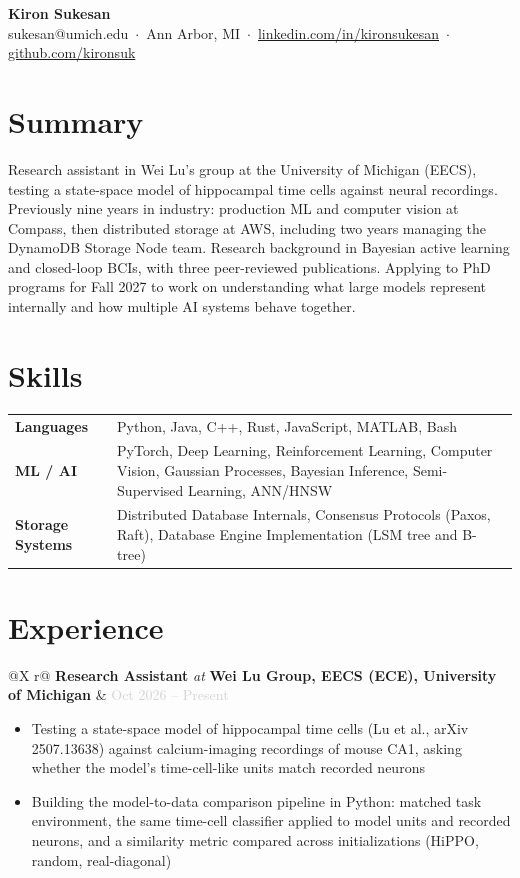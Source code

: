 \documentclass[10pt, letterpaper]{article}
\makeatletter
\newcommand{\resumeheader}[5]{%
  \begin{center}
    {\LARGE\bfseries #1}\\[4pt]
    {\color{lightgray}\small
      #2 \,$\cdot$\, #3 \,$\cdot$\, \href{#4}{linkedin.com/in/kironsukesan} \,$\cdot$\, \href{#5}{github.com/kironsuk}
    }
  \end{center}
}
\newcommand{\experienceentry}[4]{%
  \vspace{4pt}
  \noindent
  \begin{tabularx}{\linewidth}{@{}X r@{}}
    \textbf{#1} \textit{\color{lightgray}at} \textbf{#2} & \textcolor{lightgray}{\small #3} \\
    \multicolumn{2}{@{}l@{}}{\textit{\color{lightgray}\small #4}}
  \end{tabularx}
  \vspace{1pt}
}
\makeatother
\begin{document}
\pagestyle{empty}

\resumeheader
  {Kiron Sukesan}
  {sukesan@umich.edu}
  {Ann Arbor, MI}
  {https://linkedin.com/in/kironsukesan}
  {https://github.com/kironsuk}

\vspace{5pt}

\section{Summary}
Research assistant in Wei Lu's group at the University of Michigan (EECS), testing a state-space model of hippocampal time cells against neural recordings. Previously nine years in industry: production ML and computer vision at Compass, then distributed storage at AWS, including two years managing the DynamoDB Storage Node team. Research background in Bayesian active learning and closed-loop BCIs, with three peer-reviewed publications. Applying to PhD programs for Fall 2027 to work on understanding what large models represent internally and how multiple AI systems behave together.

\section{Skills}
\begin{tabularx}{\linewidth}{@{} l X @{}}
  \textbf{Languages}      & Python, Java, C++, Rust, JavaScript, MATLAB, Bash \\[2pt]
  \textbf{ML / AI}        & PyTorch, Deep Learning, Reinforcement Learning, Computer Vision, Gaussian Processes, Bayesian Inference, Semi-Supervised Learning, ANN/HNSW \\[2pt]
  \textbf{Storage Systems}        & Distributed Database Internals, Consensus Protocols (Paxos, Raft), Database Engine Implementation (LSM tree and B-tree)  \\[2pt]
\end{tabularx}

\section{Experience}

\experienceentry{Research Assistant}{Wei Lu Group, EECS (ECE), University of Michigan}{Oct 2026 -- Present}{Ann Arbor, MI}
\begin{itemize}
  \item Testing a state-space model of hippocampal time cells (Lu et al., arXiv 2507.13638) against calcium-imaging recordings of mouse CA1, asking whether the model's time-cell-like units match recorded neurons
  \item Building the model-to-data comparison pipeline in Python: matched task environment, the same time-cell classifier applied to model units and recorded neurons, and a similarity metric compared across initializations (HiPPO, random, real-diagonal)
\end{itemize}
\end{document}

